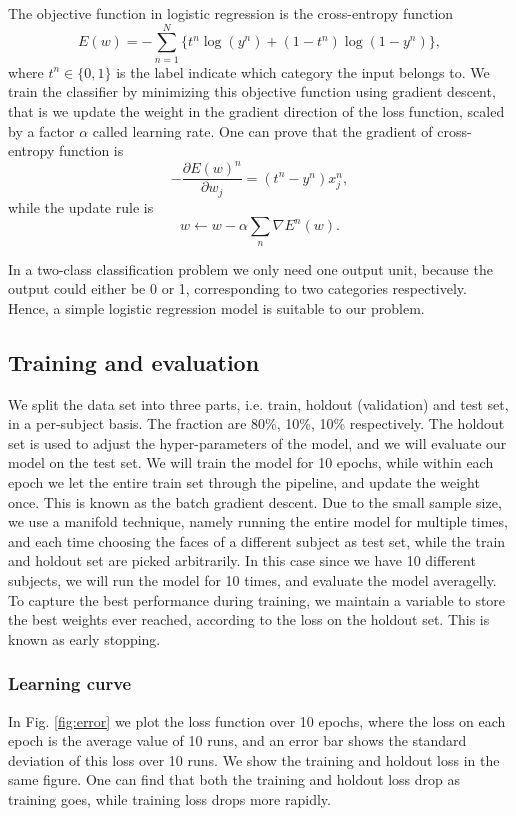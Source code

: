 \documentclass{article} %
\begin{document}
The objective function in logistic regression is the cross-entropy function
\begin{equation}
	E(w) = -\sum_{n=1}^N \{t^n\log(y^n) + (1-t^n)\log(1-y^n)\},
\end{equation}
where $t^n\in\{0,1\}$ is the label indicate which category the input belongs to. We train the classifier by minimizing this objective function using gradient descent, that is we update the weight in the gradient direction of the loss function, scaled by a factor $\alpha$ called learning rate. One can prove that the gradient of cross-entropy function is
\begin{equation}
	-\frac{\partial E(w)^n}{\partial w_j} = (t^n - y^n) x_j^n,
\end{equation}
while the update rule is
\begin{equation}
	w \leftarrow w - \alpha \sum_n \nabla E^n(w).
\end{equation}

In a two-class classification problem we only need one output unit, because the output could either be 0 or 1, corresponding to two categories respectively. Hence, a simple logistic regression model is suitable to our problem.

\subsection{Training and evaluation}
We split the data set into three parts, i.e. train, holdout (validation) and test set, in a per-subject basis. The fraction are 80\%, 10\%, 10\% respectively. The holdout set is used to adjust the hyper-parameters of the model, and we will evaluate our model on the test set. We will train the model for 10 epochs, while within each epoch we let the entire train set through the pipeline, and update the weight once. This is known as the batch gradient descent. Due to the small sample size, we use a manifold technique, namely running the entire model for multiple times, and each time choosing the faces of a different subject as test set, while the train and holdout set are picked arbitrarily. In this case since we have 10 different subjects, we will run the model for 10 times, and evaluate the model averagelly. To capture the best performance during training, we maintain a variable to store the best weights ever reached, according to the loss on the holdout set. This is known as early stopping.

\subsubsection{Learning curve}
In Fig. \ref{fig:error} we plot the loss function over 10 epochs, where the loss on each epoch is the average value of 10 runs, and an error bar shows the standard deviation of this loss over 10 runs. We show the training and holdout loss in the same figure. One can find that both the training and holdout loss drop as training goes, while training loss drops more rapidly. 
\end{document}

